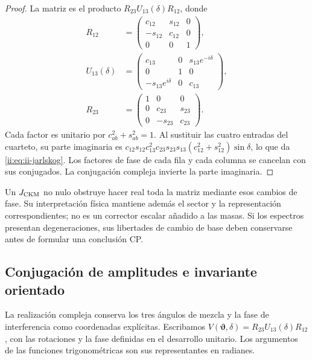 \begin{proof}
La matriz es el producto \(R_{23}U_{13}(\delta)R_{12}\), donde
\begin{equation}
\begin{aligned}
 R_{12}&=\begin{pmatrix}c_{12}&s_{12}&0\\-s_{12}&c_{12}&0\\0&0&1\end{pmatrix},
 \\
 U_{13}(\delta)&=
 \begin{pmatrix}c_{13}&0&s_{13}e^{-i\delta}\\0&1&0\\
 -s_{13}e^{i\delta}&0&c_{13}\end{pmatrix},
 \\
 R_{23}&=\begin{pmatrix}1&0&0\\0&c_{23}&s_{23}\\0&-s_{23}&c_{23}\end{pmatrix}.
\end{aligned}
 \label{ii:eq:ii-ckm-factorization}
\end{equation}
Cada factor es unitario por \(c_{ab}^2+s_{ab}^2=1\).
Al sustituir las cuatro entradas del cuarteto, su parte imaginaria es
\(c_{12}s_{12}c_{13}^2c_{23}s_{23}s_{13}
(c_{12}^2+s_{12}^2)\sin\delta\), lo que da
\eqref{ii:eq:ii-jarlskog}. Los factores de fase de cada fila y cada columna
se cancelan con sus conjugados. La conjugación compleja invierte la parte
imaginaria.
\end{proof}

Un \(J_{\rm CKM}\) no nulo obstruye hacer real toda la matriz mediante
esos cambios de fase. Su interpretación física mantiene además el sector
y la representación correspondientes; no es un corrector escalar añadido
a las masas. Si los espectros presentan degeneraciones, sus libertades de
cambio de base deben conservarse antes de formular una conclusión CP.


\subsection{Conjugación de amplitudes e invariante orientado}
\label{ii:sec:ii09-conjugacion-amplitudes}

La realización compleja conserva los tres ángulos de mezcla y
la fase de interferencia como coordenadas explícitas. Escribamos
\(V(\boldsymbol\vartheta,\delta)
=R_{23}U_{13}(\delta)R_{12}\), con las rotaciones y la fase
definidas en el desarrollo unitario. Los argumentos de las
funciones trigonométricas son sus representantes en radianes.

